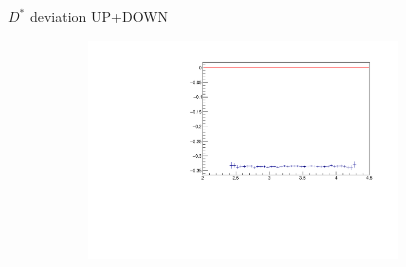 \documentclass[11pt]{beamer}
\begin{document}
\begin{frame}{$D^*$ deviation UP+DOWN}
\begin{figure}
\begin{subfigure}{0.45\textwidth}
\end{subfigure}
\begin{subfigure}{0.45\textwidth}
\includegraphics[width=0.9\textwidth]{up_plus_down_pdf/eta_4.pdf}
\end{subfigure}
\end{figure}
\end{frame}
\end{document}
